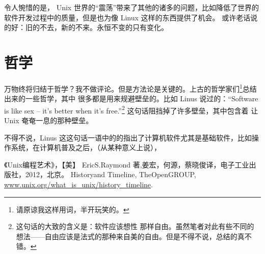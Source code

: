 \documentclass{ctexart}
\begin{document}
    令人惋惜的是， Unix 世界的“震荡”带来了其他的诸多的问题，比如降低了世界的软件开发过程中的质量，但是也为像 Linux 这样的东西提供了机会。
    或许老话说的好：旧的不去，新的不来。永恒不变的只有变化。

    \section{哲学}
    万物终将归结于哲学？我不做评论。但是方法论是关键的。上古的哲学家们\footnote{请原谅我这样用词，半开玩笑的。}总结出来的一些哲学，其中
    很多都是用来规避壁垒的。比如 Linus 说过的：“Software is like sex -- it's better when it's free.”\footnote{这句话的大致的含义是：软件应该想性
    那样自由。虽然笔者对此有些不同的想法——自由应该是法式的那种来自美的自由。但是不得不说，总结的真不错。} 这句话阻挡掉了许多壁垒，其中包含着 让
    Unix 奄奄一息的那种壁垒。

    不得不说，Linus 这这句话一语中的的指出了计算机软件尤其是基础软件，比如操作系统，在计算机普及之后，（从某种意义上说），

    \begin{thebibliography}{0}
        《Unix编程艺术》，【美】 Eric\space S.Raymond 著,姜宏，何源，蔡晓俊\space 译，电子工业出版社，2012，北京。
         History\space and \space Timeline, The\space Open\space GROUP,
        \href{http://www.unix.org/what_is_unix/history_timeline.html}{www.unix.org/what\_is\_unix/history\_timeline}.
    \end{thebibliography}
        
\end{document}
